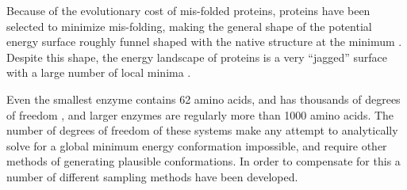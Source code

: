 Because of the evolutionary cost of mis-folded proteins, proteins have been selected to minimize mis-folding, making the general shape of the potential energy surface roughly funnel shaped with the native structure at the minimum \cite{leopold1992protein}.
Despite this shape, the energy landscape of proteins is a very ``jagged'' surface with a large number of local minima \cite{tsai1999folding}.

Even the smallest enzyme contains 62 amino acids, and has thousands of degrees of freedom \cite{chen19924}, and larger enzymes are regularly more than 1000 amino acids.
The number of degrees of freedom of these systems make any attempt to analytically solve for a global minimum energy conformation impossible, and require other methods of generating plausible conformations.
In order to compensate for this a number of different sampling methods have been developed.
